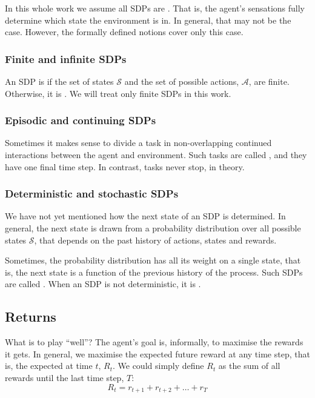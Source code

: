 In this whole work we assume all \aclp{SDP} are . That
is, the agent's sensations fully determine which state the environment is in. In
general, that may not be the case. However, the formally defined notions cover
only this case.

\subsubsection{Finite and infinite \acp{SDP}}
An \ac{SDP} is  if the set of states $\mathcal{S}$ and the
set of possible actions, $\mathcal{A}$, are finite. Otherwise, it is
. We will treat only finite \acp{SDP} in this work.

\subsubsection{Episodic and continuing \acp{SDP}}
Sometimes it makes sense to divide a task in non-overlapping continued
interactions between the agent and environment. Such tasks are called
, and they have one final time step. In contrast,
 tasks never stop, in theory.
\citep[Section~3.3]{sutton1998introduction}

\subsubsection{Deterministic and stochastic \acp{SDP}}
We have not yet mentioned how the next state of an \ac{SDP} is determined. In
general, the next state is drawn from a probability distribution over all
possible states $\mathcal{S}$, that depends on the past history of actions,
states and rewards.

Sometimes, the probability distribution has all its weight on a single
state, that is, the next state is a function of the previous history of the
process. Such \acp{SDP} are called . When an \ac{SDP} is not
deterministic, it is .

\subsection{Returns}
What is to play ``well''? The agent's goal is, informally, to maximise the rewards it
gets. In general, we maximise the expected future reward at any time step,
that is, the expected  at time $t$, $R_t$.
We could simply define $R_t$ as the sum of all rewards until the last time step, $T$:
\begin{equation}
  R_t = r_{t+1} + r_{t+2} + \dots + r_T
  \label{eq:undiscounted-reward}
\end{equation}

